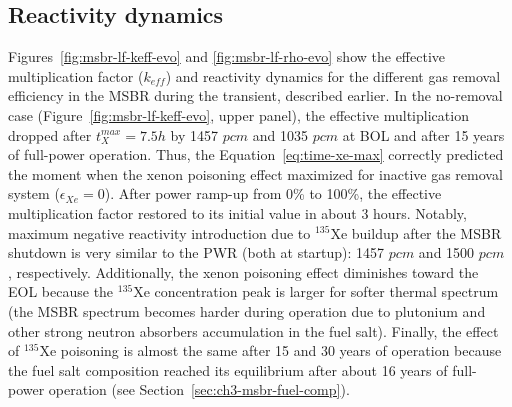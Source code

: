 \subsection{Reactivity dynamics}
Figures~\ref{fig:msbr-lf-keff-evo} and \ref{fig:msbr-lf-rho-evo} show the 
effective multiplication factor ($k_{eff}$) and reactivity dynamics for the 
different gas removal efficiency in the \gls{MSBR} during the transient, 
described earlier. In the no-removal case (Figure~\ref{fig:msbr-lf-keff-evo}, 
upper panel), the effective multiplication 
dropped after $t^{max}_X=7.5h$ by 1457 $pcm$ and 1035 $pcm$ at \gls{BOL} and 
after 15 years of full-power operation. Thus, the 
Equation~\ref{eq:time-xe-max} correctly predicted the moment when the xenon 
poisoning effect maximized for inactive gas removal system ($\epsilon_{Xe}=0$).
After power ramp-up from 0\% to 100\%, the effective multiplication factor 
restored to its initial value in about 3 hours. Notably, maximum 
negative reactivity introduction due to $^{135}$Xe buildup after the 
\gls{MSBR} shutdown is very similar to the \gls{PWR} (both at startup): 1457 
$pcm$ and 1500 $pcm$ \cite{rykhlevskii_impact_2019}, respectively. 
Additionally, the xenon poisoning effect diminishes toward the \gls{EOL} 
because the $^{135}$Xe concentration peak is larger for softer thermal 
spectrum (the \gls{MSBR} spectrum becomes harder during  operation due to 
plutonium and other strong neutron absorbers accumulation in the fuel salt).
Finally, the effect of $^{135}$Xe poisoning is almost the same after 15 and 30 
years of operation because the fuel salt composition reached its equilibrium 
after about 16 years of full-power operation (see 
Section~\ref{sec:ch3-msbr-fuel-comp}).

